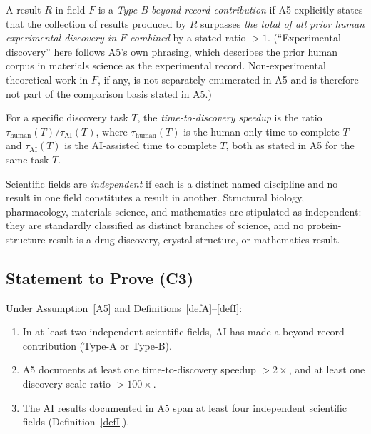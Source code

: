 \begin{definition}\label{defB}
  A result $R$ in field $F$ is a \emph{Type-B beyond-record contribution}
  if A5 explicitly states that the collection of results produced by $R$
  surpasses \emph{the total of all prior human experimental discovery in
  $F$ combined} by a stated ratio $> 1$.
  (``Experimental discovery'' here follows A5's own phrasing, which
  describes the prior human corpus in materials science as the
  experimental record.  Non-experimental theoretical work in $F$, if
  any, is not separately enumerated in A5 and is therefore not part of
  the comparison basis stated in A5.)
\end{definition}

\begin{definition}\label{defS}
  For a specific discovery task $T$, the \emph{time-to-discovery speedup}
  is the ratio $\tau_{\mathrm{human}}(T) / \tau_{\mathrm{AI}}(T)$, where
  $\tau_{\mathrm{human}}(T)$ is the human-only time to complete $T$ and
  $\tau_{\mathrm{AI}}(T)$ is the AI-assisted time to complete $T$, both
  as stated in A5 for the same task $T$.
\end{definition}

\begin{definition}\label{defI}
  Scientific fields are \emph{independent} if each is a distinct named
  discipline and no result in one field constitutes a result in another.
  Structural biology, pharmacology, materials science, and mathematics
  are stipulated as independent: they are standardly classified as
  distinct branches of science, and no protein-structure result is a
  drug-discovery, crystal-structure, or mathematics result.
\end{definition}

\subsection*{Statement to Prove (C3)}

\begin{theorem}\label{thm:C3}
  Under Assumption~\ref{A5} and
  Definitions~\ref{defA}--\ref{defI}:
  \begin{enumerate}
    \item[(i)] In at least two independent scientific fields, AI has made
      a beyond-record contribution (Type-A or Type-B).
    \item[(ii)] A5 documents at least one time-to-discovery speedup
      $>2\times$, and at least one discovery-scale ratio $>100\times$.
    \item[(iii)] The AI results documented in A5 span at least four
      independent scientific fields (Definition~\ref{defI}).
  \end{enumerate}
\end{theorem}

